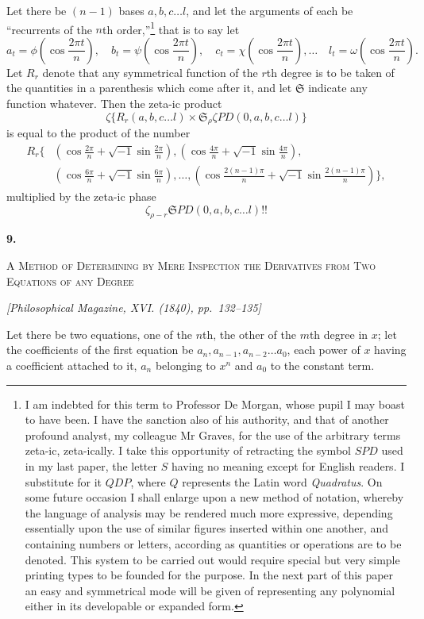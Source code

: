 \documentclass[11pt]{article}
\newcommand{\paperhead}[3]{%
  \clearpage
  \begin{center}
  {\Large\bfseries #1.}\par\vspace{0.85em}
  {\large\scshape #2}\par\vspace{0.6em}
  {\itshape [#3]}\par
  \end{center}\vspace{0.4em}}
\newcommand{\sourcepage}[1]{\marginpar{\scriptsize p.~#1}}
\newcommand{\SPD}{\mathit{SPD}}
\newcommand{\QDP}{\mathit{QDP}}
\newcommand{\PD}{\mathit{PD}}
\newcommand{\arb}{\mathfrak{S}}
\begin{document}
\sourcepage{53}
Let there be $(n-1)$ bases $a,b,c\ldots l$, and let the arguments of each be ``recurrents of the $n$th order,''\footnote{I am indebted for this term to Professor De Morgan, whose pupil I may boast to have been. I have the sanction also of his authority, and that of another profound analyst, my colleague Mr Graves, for the use of the arbitrary terms zeta-ic, zeta-ically. I take this opportunity of retracting the symbol $\SPD$ used in my last paper, the letter $S$ having no meaning except for English readers. I substitute for it $\QDP$, where $Q$ represents the Latin word \emph{Quadratus}. On some future occasion I shall enlarge upon a new method of notation, whereby the language of analysis may be rendered much more expressive, depending essentially upon the use of similar figures inserted within one another, and containing numbers or letters, according as quantities or operations are to be denoted. This system to be carried out would require special but very simple printing types to be founded for the purpose. In the next part of this paper an easy and symmetrical mode will be given of representing any polynomial either in its developable or expanded form.} that is to say let
\[
 a_t=\phi\left(\cos\frac{2\pi t}{n}\right),\quad
 b_t=\psi\left(\cos\frac{2\pi t}{n}\right),\quad
 c_t=\chi\left(\cos\frac{2\pi t}{n}\right),\ldots\quad
 l_t=\omega\left(\cos\frac{2\pi t}{n}\right).
\]
Let $R_r$ denote that any symmetrical function of the $r$th degree is to be taken of the quantities in a parenthesis which come after it, and let $\arb$ indicate any function whatever. Then the zeta-ic product
\[
 \zeta\{R_r(a,b,c\ldots l)\times \arb_{\rho}\zeta\PD(0,a,b,c\ldots l)\}
\]
is equal to the product of the number
\[
\begin{aligned}
 R_r\bigg\{&\left(\cos\frac{2\pi}{n}+\sqrt{-1}\sin\frac{2\pi}{n}\right),
 \left(\cos\frac{4\pi}{n}+\sqrt{-1}\sin\frac{4\pi}{n}\right),\\
&\left(\cos\frac{6\pi}{n}+\sqrt{-1}\sin\frac{6\pi}{n}\right),
 \ldots,
 \left(\cos\frac{2(n-1)\pi}{n}+\sqrt{-1}\sin\frac{2(n-1)\pi}{n}\right)\bigg\},
\end{aligned}
\]
multiplied by the zeta-ic phase
\[
 \zeta_{\rho-r}\arb\PD(0,a,b,c\ldots l)!!
\]

\paperhead{9}{A Method of Determining by Mere Inspection the Derivatives from Two Equations of any Degree}{Philosophical Magazine, XVI. (1840), pp.~132--135}

\sourcepage{54}
Let there be two equations, one of the $n$th, the other of the $m$th degree in $x$; let the coefficients of the first equation be $a_n,a_{n-1},a_{n-2}\ldots a_0$, each power of $x$ having a coefficient attached to it, $a_n$ belonging to $x^n$ and $a_0$ to the constant term.
\end{document}
